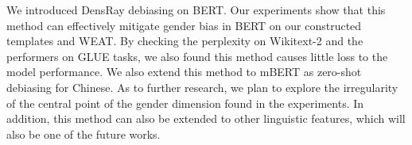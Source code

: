 We introduced DensRay debiasing on BERT. Our experiments show that this method can effectively mitigate gender bias in BERT on our constructed templates and WEAT. By checking the perplexity on Wikitext-2 and the performers on GLUE tasks, we also found this method causes little loss to the model performance. We also extend this method to mBERT as zero-shot debiasing for Chinese. As to further research, we plan to explore the irregularity of the central point of the gender dimension found in the experiments. In addition, this method can also be extended to other linguistic features, which will also be one of the future works.